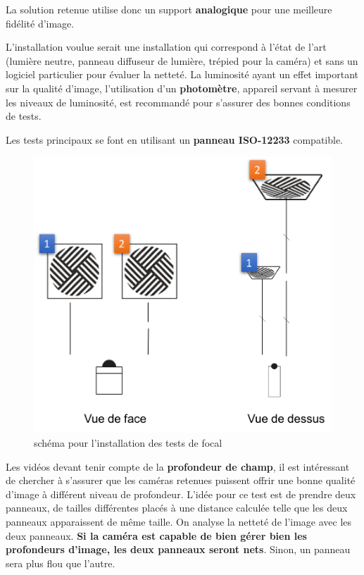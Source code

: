   La solution retenue utilise donc un support \textbf{analogique} pour une meilleure fidélité d'image.
  
  L'installation voulue serait une installation qui correspond à l'état de l'art (lumière neutre, panneau diffuseur de lumière, trépied pour la caméra) et sans un logiciel particulier pour évaluer la netteté. La luminosité ayant un effet important sur la qualité d'image, l'utilisation d'un \textbf{photomètre}, appareil servant à mesurer les niveaux de luminosité, est recommandé pour s'assurer des bonnes conditions de tests.
  
  Les tests principaux se font en utilisant un \textbf{panneau ISO-12233} compatible.
  
\begin{minipage}{0.4\textwidth}
  \begin{figure}[H]
    \centering
    \includegraphics[width=\textwidth]{img/test_focal.png}
    \caption{schéma pour l'installation des tests de focal}
  \end{figure}
\end{minipage}
\hfill%
\begin{minipage}[adjusting]{0.52\textwidth}
  Les vidéos devant tenir compte de la \textbf{profondeur de champ}, il est intéressant de chercher à s'assurer que les caméras retenues puissent offrir une bonne qualité d'image à différent niveau de profondeur.
L'idée pour ce test est de prendre deux panneaux, de tailles différentes placés à une distance calculée telle que les deux panneaux apparaissent de même taille. On analyse la netteté de l'image avec les deux panneaux. \textbf{Si la caméra est capable de bien gérer bien les profondeurs d'image, les deux panneaux seront nets}. Sinon, un panneau sera plus flou que l'autre. 
\end{minipage}\par

